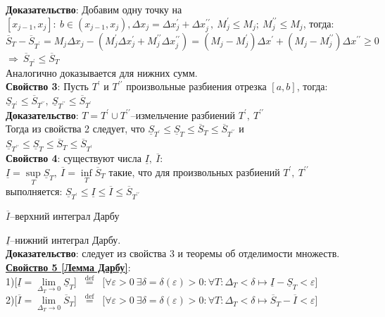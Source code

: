 \documentclass[a4paper,12pt]{article} %
\begin{document}
\textbf{Доказательство}: Добавим одну точку на $[x_{j-1},x_j]:~b\in (x_{j-1},x_j), \Delta x_j = \Delta x^{\prime}_j +\Delta x^{\prime\prime}_j,~M^{\prime}_j\leq M_j;~M^{\prime\prime}_j\leq M_j$, тогда:\\
$$\overline{S}_T-\overline{S}_{T^{\prime}}=M_j\Delta x_j-(M^{\prime}_j\Delta x^{\prime}_j+M^{\prime\prime}_j\Delta x^{\prime\prime}_j)=(M_j-M^{\prime}_j)\Delta x^{\prime}+(M_j-M^{\prime\prime}_j)\Delta x^{\prime\prime}\geq0$$
$\Rightarrow~\overline{S}_{T^{\prime}}\leq \overline{S}_T$\\
Аналогично доказывается для нижних сумм.\\

\textbf{Свойство 3}: Пусть $T^{\prime}$ и $T^{\prime\prime}$ произвольные разбиения отрезка $[a,b]$, тогда:
$\underline{S}_{T^{\prime}}\leq \overline{S}_{T^{\prime\prime}},~\underline{S}_{T^{\prime\prime}}\leq \overline{S}_{T^{\prime}}$\\

\textbf{Доказательство}: $T = T^{\prime}\cup T^{\prime\prime}$--измельчение разбиений $T^{\prime},~ T^{\prime\prime}$\\
Тогда из свойства 2 следует, что $\underline{S}_{T^{\prime}}\leq \underline{S}_T\leq \overline{S}_T\leq \overline{S}_{T^{\prime\prime}}$ и\\
$\underline{S}_{T^{\prime\prime}}\leq \underline{S}_T\leq \overline{S}_T\leq \overline{S}_{T^{\prime}}$\\


\textbf{Свойство 4}: существуют числа $\underline{I},~\overline{I}$:\\
$\underline{I}=\sup\limits_{T}{\underline{S}_T,~\overline{I}=\inf\limits_{T}{\overline{S}_T}}$ такие, что для произвольных разбиений $T^{\prime},~T^{\prime\prime}$ выполняется: 
$\underline{S}_{T^{\prime}}\leq \underline{I}\leq \overline{I}\leq \overline{S}_{T^{\prime\prime}}$

$\overline{I}$--верхний интеграл Дарбу

$\underline{I}$--нижний интеграл Дарбу.\\

\textbf{Доказательство}: следует из свойства 3 и теоремы об отделимости множеств.\\

\underline{\textbf{Свойство 5 [Лемма Дарбу]}}:\\
1)[$\underline{I}=\lim\limits_{\Delta_T\rightarrow 0}{\underline{S}_T}$] $\stackrel{\text { def }}{=}$ [$\forall\varepsilon>0~\exists\delta = \delta(\varepsilon)>0: \forall T:\Delta_{T}<\delta \longmapsto \underline{I}-\underline{S}_T<\varepsilon$]\\
2)[$\overline{I}=\lim\limits_{\Delta_T\rightarrow 0}{\overline{S}_T}$] $\stackrel{\text { def }}{=}$ [$\forall\varepsilon>0~\exists\delta = \delta(\varepsilon)>0: \forall T:\Delta_{T}<\delta \longmapsto \overline{S}_T-\overline{I}<\varepsilon$]\\
\end{document}
